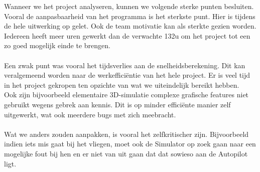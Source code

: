 \documentclass[]{penoverslag}
\begin{document}
Wanneer we het project analyseren, kunnen we volgende sterke punten besluiten. Vooral de aanpasbaarheid van het programma is het sterkste punt. Hier is tijdens de hele uitwerking op gelet. Ook de team motivatie kan als sterkte gezien worden. Iedereen heeft meer uren gewerkt dan de verwachte 132u om het project tot een zo goed mogelijk einde te brengen.
\\
\\
Een zwak punt was vooral het tijdsverlies aan de snelheidsberekening. Dit kan veralgemeend worden naar de werkeffici\"entie van het hele project. Er is veel tijd in het project gekropen ten opzichte van wat we uiteindelijk bereikt hebben.
\\
Ook zijn bijvoorbeeld elementaire 3D-simulatie complexe grafische features niet gebruikt wegens gebrek aan kennis. Dit is op minder effici\"ente manier zelf uitgewerkt, wat ook meerdere bugs met zich meebracht.
\\
\\
Wat we anders zouden aanpakken, is vooral het zelfkritischer zijn. Bijvoorbeeld indien iets mis gaat bij het vliegen, moet ook de Simulator op zoek gaan naar een mogelijke fout bij hen en er niet van uit gaan dat dat sowieso aan de Autopilot ligt. 
\end{document}
